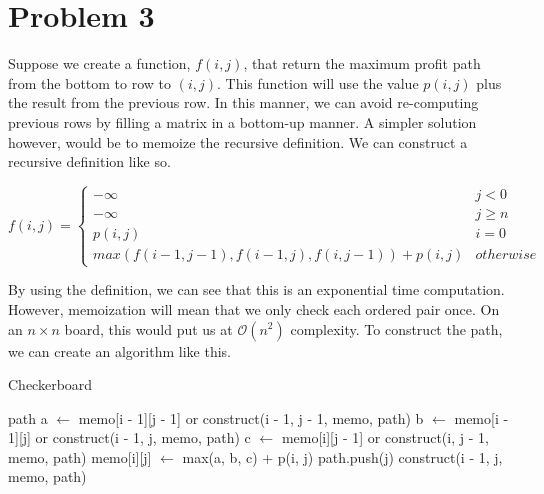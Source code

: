 \documentclass{article}
\newenvironment{problem}[1]{
  \nobreak\section*{Problem #1}
}{}
\newcommand*{\Let}[2]{\State #1 $\gets$ #2}
\newcommand*{\bigO}[1]{\ensuremath{\mathcal{O}\left(#1\right)}}
\begin{document}
  \pagebreak

  \begin{problem}{3}
    Suppose we create a function, $f(i, j)$, that return the maximum
    profit path from the bottom to row to $(i, j)$.  This function 
    will use the value $p(i, j)$ plus the result from the previous
    row.  In this manner, we can avoid re-computing previous rows by
    filling a matrix in a bottom-up manner.  A simpler solution 
    however, would be to memoize the recursive definition.  We can
    construct a recursive definition like so.

    \begin{displaymath}
      f(i, j) = \begin{cases}
        -\infty & j < 0 \\
        -\infty & j \ge n \\
        p(i, j) & i = 0 \\
        max(f(i - 1, j - 1), f(i - 1, j), f(i, j - 1)) + p(i, j) & otherwise
      \end{cases}
    \end{displaymath}

    By using the definition, we can see that this is an exponential
    time computation.  However, memoization will mean that we only
    check each ordered pair once.  On an $n \times n$ board, this
    would put us at \bigO{n^2} complexity.  To construct the path, we
    can create an algorithm like this.

    \begin{algorithm}
      \caption{Checkerboard}
      \begin{algorithmic}[1]
            \State \Return path
          \EndIf
          \Let{a}{memo[i - 1][j - 1] or construct(i - 1, j - 1, memo, path)}
          \Let{b}{memo[i - 1][j] or construct(i - 1, j, memo, path)}
          \Let{c}{memo[i][j - 1] or construct(i, j - 1, memo, path)}
          \Let{memo[i][j]}{max(a, b, c) + p(i, j)}
          \State path.push(j)
          \State \Return construct(i - 1, j, memo, path)
        \EndFunction
      \end{algorithmic}
    \end{algorithm}
  \end{problem}

  \pagebreak
\end{document}
